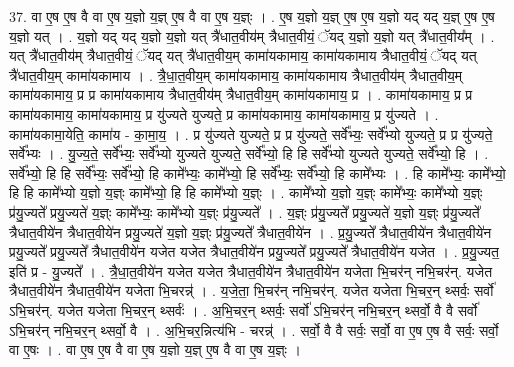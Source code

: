 \documentclass[17pt]{extarticle}
\begin{document}
37. वा ए॒ष ए॒ष वै वा ए॒ष य॒ज्ञो य॒ज्ञ् ए॒ष वै वा ए॒ष य॒ज्ञ्ः । . ए॒ष य॒ज्ञो य॒ज्ञ् ए॒ष ए॒ष य॒ज्ञो यद् यद् य॒ज्ञ् ए॒ष ए॒ष य॒ज्ञो यत् । . य॒ज्ञो यद् यद् य॒ज्ञो य॒ज्ञो यत् त्रै॑धात॒वीय॑म् त्रैधात॒वीयं॒ ॅयद् य॒ज्ञो य॒ज्ञो यत् त्रै॑धात॒वीय᳚म् । . यत् त्रै॑धात॒वीय॑म् त्रैधात॒वीयं॒ ॅयद् यत् त्रै॑धात॒वीय॒म् कामा॑यकामाय॒ कामा॑यकामाय त्रैधात॒वीयं॒ ॅयद् यत् त्रै॑धात॒वीय॒म् कामा॑यकामाय । . त्रै॒धा॒त॒वीय॒म् कामा॑यकामाय॒ कामा॑यकामाय त्रैधात॒वीय॑म् त्रैधात॒वीय॒म् कामा॑यकामाय॒ प्र प्र कामा॑यकामाय त्रैधात॒वीय॑म् त्रैधात॒वीय॒म् कामा॑यकामाय॒ प्र । . कामा॑यकामाय॒ प्र प्र कामा॑यकामाय॒ कामा॑यकामाय॒ प्र यु॑ज्यते युज्यते॒ प्र कामा॑यकामाय॒ कामा॑यकामाय॒ प्र यु॑ज्यते । . कामा॑यकामा॒येति॒ कामा॑य - का॒मा॒य॒ । . प्र यु॑ज्यते युज्यते॒ प्र प्र यु॑ज्यते॒ सर्वे᳚भ्यः॒ सर्वे᳚भ्यो युज्यते॒ प्र प्र यु॑ज्यते॒ सर्वे᳚भ्यः । . यु॒ज्य॒ते॒ सर्वे᳚भ्यः॒ सर्वे᳚भ्यो युज्यते युज्यते॒ सर्वे᳚भ्यो॒ हि हि सर्वे᳚भ्यो युज्यते युज्यते॒ सर्वे᳚भ्यो॒ हि । . सर्वे᳚भ्यो॒ हि हि सर्वे᳚भ्यः॒ सर्वे᳚भ्यो॒ हि कामे᳚भ्यः॒ कामे᳚भ्यो॒ हि सर्वे᳚भ्यः॒ सर्वे᳚भ्यो॒ हि कामे᳚भ्यः । . हि कामे᳚भ्यः॒ कामे᳚भ्यो॒ हि हि कामे᳚भ्यो य॒ज्ञो य॒ज्ञ्ः कामे᳚भ्यो॒ हि हि कामे᳚भ्यो य॒ज्ञ्ः । . कामे᳚भ्यो य॒ज्ञो य॒ज्ञ्ः कामे᳚भ्यः॒ कामे᳚भ्यो य॒ज्ञ्ः प्र॑यु॒ज्यते᳚ प्रयु॒ज्यते॑ य॒ज्ञ्ः कामे᳚भ्यः॒ कामे᳚भ्यो य॒ज्ञ्ः प्र॑यु॒ज्यते᳚ । . य॒ज्ञ्ः प्र॑यु॒ज्यते᳚ प्रयु॒ज्यते॑ य॒ज्ञो य॒ज्ञ्ः प्र॑यु॒ज्यते᳚ त्रैधात॒वीये॑न त्रैधात॒वीये॑न प्रयु॒ज्यते॑ य॒ज्ञो य॒ज्ञ्ः प्र॑यु॒ज्यते᳚ त्रैधात॒वीये॑न । . प्र॒यु॒ज्यते᳚ त्रैधात॒वीये॑न त्रैधात॒वीये॑न प्रयु॒ज्यते᳚ प्रयु॒ज्यते᳚ त्रैधात॒वीये॑न यजेत यजेत त्रैधात॒वीये॑न प्रयु॒ज्यते᳚ प्रयु॒ज्यते᳚ त्रैधात॒वीये॑न यजेत । . प्र॒यु॒ज्यत॒ इति॑ प्र - यु॒ज्यते᳚ । . त्रै॒धा॒त॒वीये॑न यजेत यजेत त्रैधात॒वीये॑न त्रैधात॒वीये॑न यजेता भि॒चर॑न् नभि॒चर॑न्. यजेत त्रैधात॒वीये॑न त्रैधात॒वीये॑न यजेता भि॒चरन्न्॑ । . य॒जे॒ता॒ भि॒चर॑न् नभि॒चर॑न्. यजेत यजेता भि॒चर॒न् थ्सर्वः॒ सर्वो॑ ऽभि॒चर॑न्. यजेत यजेता भि॒चर॒न् थ्सर्वः॑ । . अ॒भि॒चर॒न् थ्सर्वः॒ सर्वो॑ ऽभि॒चर॑न् नभि॒चर॒न् थ्सर्वो॒ वै वै सर्वो॑ ऽभि॒चर॑न् नभि॒चर॒न् थ्सर्वो॒ वै । . अ॒भि॒चर॒न्नित्य॑भि - चरन्न्॑ । . सर्वो॒ वै वै सर्वः॒ सर्वो॒ वा ए॒ष ए॒ष वै सर्वः॒ सर्वो॒ वा ए॒षः । . वा ए॒ष ए॒ष वै वा ए॒ष य॒ज्ञो य॒ज्ञ् ए॒ष वै वा ए॒ष य॒ज्ञ्ः । \newline
\pagebreak
{}
\end{document}
